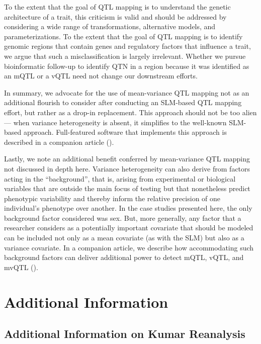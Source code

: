     To the extent that the goal of QTL mapping is to understand the genetic architecture of a trait, this criticism is valid and should be addressed by considering a wide range of transformations, alternative models, and parameterizations.
    To the extent that the goal of QTL mapping is to identify genomic regions that contain genes and regulatory factors that influence a trait, we argue that such a misclassification is largely irrelevant.
    Whether we pursue bioinformatic follow-up to identify QTN in a region because it was identified as an mQTL or a vQTL need not change our downstream efforts.

    In summary, we advocate for the use of mean-variance QTL mapping not as an additional flourish to consider after conducting an SLM-based QTL mapping effort, but rather as a drop-in replacement.
    This approach should not be too alien --- when variance heterogeneity is absent, it simplifies to the well-known SLM-based approach.
    Full-featured software that implements this approach is described in a companion article (\CortyRPaper).

    Lastly, we note an additional benefit conferred by mean-variance QTL mapping not discussed in depth here.
    Variance heterogeneity can also derive from factors acting in the ``background'', that is, arising from experimental or biological variables that are outside the main focus of testing but that nonetheless predict phenotypic variability and thereby inform the relative precision of one individual's phenotype over another.
    In the case studies presented here, the only background factor considered was sex.
    But, more generally, any factor that a researcher considers as a potentially important covariate that should be modeled can be included not only as a mean covariate (as with the SLM) but also as a variance covariate.
    In a companion article, we describe how accommodating such background factors can deliver additional power to detect mQTL, vQTL, and mvQTL (\CortyMethodsPaper).


\FloatBarrier
\clearpage
\section{Additional Information}
    
    
    \subsection{Additional Information on Kumar Reanalysis}


